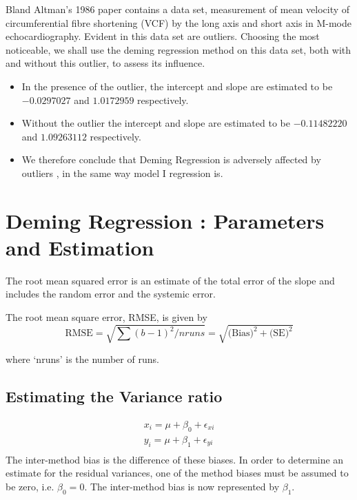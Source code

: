 \documentclass[12pt, a4paper]{report}
\theoremstyle{plain}
\theoremstyle{definition}
\theoremstyle{remark}
\begin{document}
Bland Altman's 1986 paper contains a data set, measurement of mean velocity of circumferential fibre shortening (VCF) by the long axis and short axis in M-mode echocardiography. Evident in this data set are outliers. Choosing the most noticeable, we shall use the deming regression method on this data set, both with and
without this outlier, to assess its influence.
\begin{itemize}
	\item In the presence of the outlier, the intercept and slope are estimated to be $-0.0297027$ and $1.0172959$ respectively.
	\item Without the outlier the intercept and slope are estimated to be
	$-0.11482220$ and  $1.09263112$ respectively.
	\item We therefore conclude that Deming Regression is adversely affected
	by outliers , in the same way model I regression is.
\end{itemize}



\section{Deming Regression : Parameters and Estimation}

The root mean squared error is an estimate of the total error of the slope and includes the random error and the systemic error.

The root mean square error, RMSE,  is given by
\begin{equation*}
	\mbox{RMSE} = \sqrt{\sum{(b-1)^2/nruns}} =
	\sqrt{\mbox{(Bias)}^{2}+ \mbox{(SE)}^{2}}
\end{equation*}

where `nruns' is the number of runs.

\subsection{Estimating the Variance ratio}
\begin{eqnarray*}
	x_{i} = \mu +  \beta_{0} + \epsilon_{xi}\\
	y_{i} = \mu +  \beta_{1} + \epsilon_{yi}\\
\end{eqnarray*}
The inter-method bias is the difference of these biases. In order to determine an estimate for the residual variances, one of the method biases must be assumed to be zero, i.e. $\beta_{0} = 0$. The inter-method bias is now represented by $\beta_{1}$.
\end{document}
